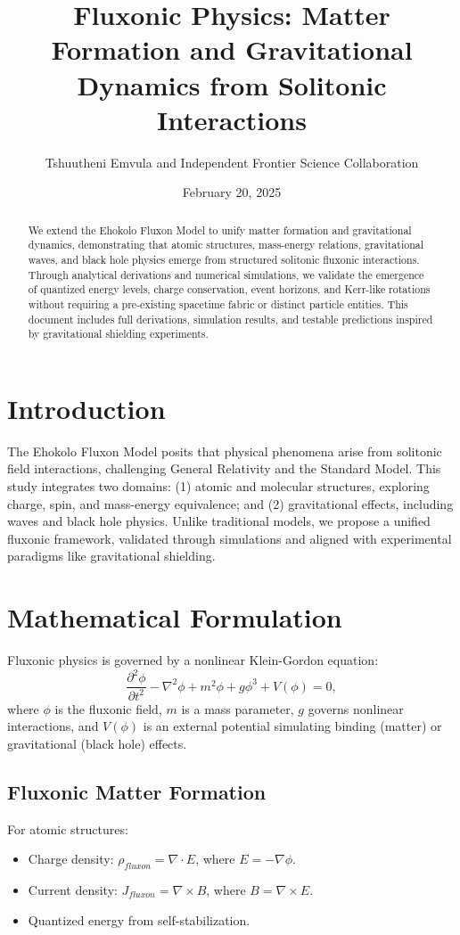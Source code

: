 \documentclass{article}
\title{Fluxonic Physics: Matter Formation and Gravitational Dynamics from Solitonic Interactions}
\author{Tshuutheni Emvula and Independent Frontier Science Collaboration}
\date{February 20, 2025}
\begin{document}
\maketitle

\begin{abstract}
We extend the Ehokolo Fluxon Model to unify matter formation and gravitational dynamics, demonstrating that atomic structures, mass-energy relations, gravitational waves, and black hole physics emerge from structured solitonic fluxonic interactions. Through analytical derivations and numerical simulations, we validate the emergence of quantized energy levels, charge conservation, event horizons, and Kerr-like rotations without requiring a pre-existing spacetime fabric or distinct particle entities. This document includes full derivations, simulation results, and testable predictions inspired by gravitational shielding experiments.
\end{abstract}

\section{Introduction}
The Ehokolo Fluxon Model posits that physical phenomena arise from solitonic field interactions, challenging General Relativity and the Standard Model. This study integrates two domains: (1) atomic and molecular structures, exploring charge, spin, and mass-energy equivalence; and (2) gravitational effects, including waves and black hole physics. Unlike traditional models, we propose a unified fluxonic framework, validated through simulations and aligned with experimental paradigms like gravitational shielding.

\section{Mathematical Formulation}
Fluxonic physics is governed by a nonlinear Klein-Gordon equation:
\begin{equation}
\frac{\partial^2 \phi}{\partial t^2} - \nabla^2 \phi + m^2 \phi + g \phi^3 + V(\phi) = 0,
\end{equation}
where \(\phi\) is the fluxonic field, \(m\) is a mass parameter, \(g\) governs nonlinear interactions, and \(V(\phi)\) is an external potential simulating binding (matter) or gravitational (black hole) effects.

\subsection{Fluxonic Matter Formation}
For atomic structures:
\begin{itemize}
    \item Charge density: \(\rho_{fluxon} = \nabla \cdot E\), where \(E = -\nabla \phi\).
    \item Current density: \(J_{fluxon} = \nabla \times B\), where \(B = \nabla \times E\).
    \item Quantized energy from self-stabilization.
\end{itemize}
\end{document}
